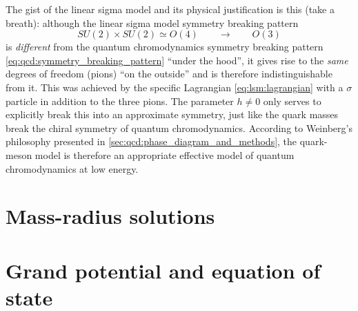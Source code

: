 The gist of the linear sigma model and its physical justification is this (take a breath):
although the linear sigma model symmetry breaking pattern
\begin{equation}
	SU(2) \times SU(2) \simeq O(4) \qquad \longrightarrow \qquad O(3)
\end{equation}
is \emph{different} from the quantum chromodynamics symmetry breaking pattern \eqref{eq:qcd:symmetry_breaking_pattern} ``under the hood'',
it gives rise to the \emph{same} degrees of freedom (pions) ``on the outside'' and is therefore indistinguishable from it.
This was achieved by the specific Lagrangian \eqref{eq:lsm:lagrangian} with a $\sigma$ particle in addition to the three pions.
The parameter $h \neq 0$ only serves to explicitly break this into an approximate symmetry,
just like the quark masses break the chiral symmetry of quantum chromodynamics.
According to Weinberg's philosophy presented in \cref{sec:qcd:phase_diagram_and_methods},
the quark-meson model is therefore an appropriate effective model of quantum chromodynamics at low energy.


\section{Mass-radius solutions}



\section{Grand potential and equation of state}




